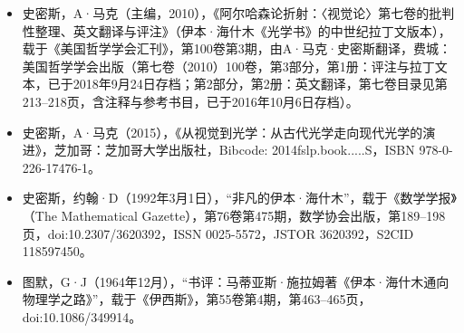 \begin{itemize}
\item 史密斯，A·马克（主编，2010），《阿尔哈森论折射：〈视觉论〉第七卷的批判性整理、英文翻译与评注》（伊本·海什木《光学书》的中世纪拉丁文版本），载于《美国哲学学会汇刊》，第100卷第3期，由A·马克·史密斯翻译，费城：美国哲学学会出版（第七卷（2010）100卷，第3部分，第1册：评注与拉丁文本，已于2018年9月24日存档；第2部分，第2册：英文翻译，第七卷目录见第213–218页，含注释与参考书目，已于2016年10月6日存档）。
\item 史密斯，A·马克（2015），《从视觉到光学：从古代光学走向现代光学的演进》，芝加哥：芝加哥大学出版社，Bibcode: 2014fslp.book.....S，ISBN 978-0-226-17476-1。
\item 史密斯，约翰·D（1992年3月1日），“非凡的伊本·海什木”，载于《数学学报》（The Mathematical Gazette），第76卷第475期，数学协会出版，第189–198页，doi:10.2307/3620392，ISSN 0025-5572，JSTOR 3620392，S2CID 118597450。
\item 图默，G·J（1964年12月），“书评：马蒂亚斯·施拉姆著《伊本·海什木通向物理学之路》”，载于《伊西斯》，第55卷第4期，第463–465页，doi:10.1086/349914。

\end{itemize}